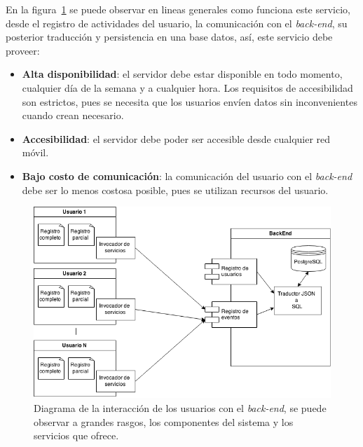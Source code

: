 En la figura~\ref{fig:backend_diagrama} se puede observar en lineas generales como 
funciona este servicio, desde el registro de actividades del usuario, la comunicación 
con el \textit{back-end}, su posterior traducción y persistencia
en una base datos, así, este servicio debe proveer:

\begin{itemize}
    \item \textbf{Alta disponibilidad}: el servidor debe estar disponible en
        todo momento, cualquier día de la semana y a cualquier hora. Los
        requisitos de accesibilidad son estrictos, pues se necesita que los
        usuarios envíen datos sin inconvenientes cuando crean necesario.
    \item \textbf{Accesibilidad}: el servidor debe poder ser accesible desde
        cualquier red móvil.
    \item \textbf{Bajo costo de comunicación}: la comunicación del usuario con
        el \textit{back-end} debe ser lo menos costosa posible, pues se utilizan
        recursos del usuario.
\end{itemize}

\begin{figure}[H]
\centering
\includegraphics[scale=0.5]{tecnologias/images/backend_diagrama.png}
\caption{Diagrama de la interacción de los usuarios con el \textit{back-end}, se
    puede observar a grandes rasgos, los componentes del sistema y los servicios
    que ofrece.}
\label{fig:backend_diagrama}
\end{figure}

